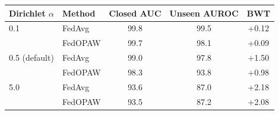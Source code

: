 \begin{tabular}{@{}llccc@{}}
\toprule
Dirichlet $\alpha$ & Method & Closed AUC & Unseen AUROC & BWT \\
\midrule
0.1 & FedAvg & 99.8 & 99.5 & +0.12 \\
 & FedOPAW & 99.7 & 98.1 & +0.09 \\
0.5 (default) & FedAvg & 99.0 & 97.8 & +1.50 \\
 & FedOPAW & 98.3 & 93.8 & +0.98 \\
5.0 & FedAvg & 93.6 & 87.0 & +2.18 \\
 & FedOPAW & 93.5 & 87.2 & +2.08 \\
\bottomrule
\end{tabular}
